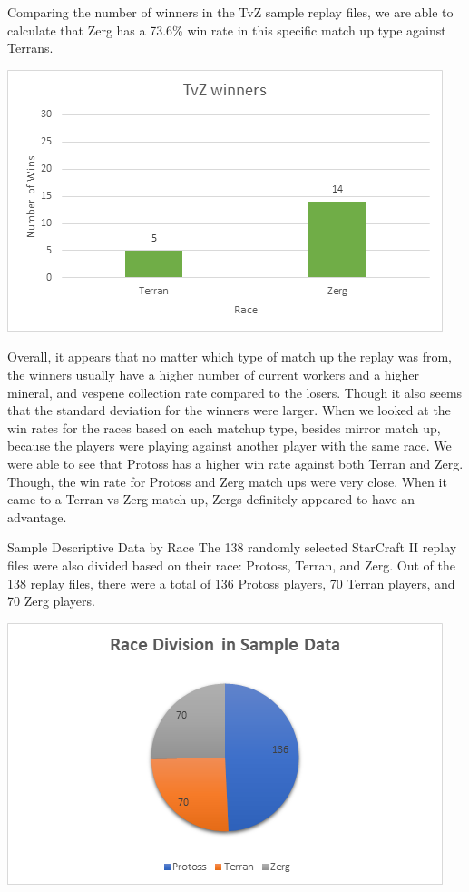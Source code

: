 \documentclass[a4paper,12pt]{report}
\begin{document}
Comparing the number of winners in the TvZ sample replay files, we are able to calculate that Zerg has a 73.6\% win rate in this specific match up type against Terrans.

\begin{center}
    \captionsetup{type=figure}
    \includegraphics[width=.9\linewidth]{media/TvZwinrate.png}
\end{center}

Overall, it appears that no matter which type of match up the replay was from, the winners usually have a higher number of current workers and a higher mineral, and vespene collection rate compared to the losers. Though it also seems that the standard deviation for the winners were larger. When we looked at the win rates for the races based on each matchup type, besides mirror match up, because the players were playing against another player with the same race. We were able to see that Protoss has a higher win rate against both Terran and Zerg. Though, the win rate for Protoss and Zerg match ups were very close. When it came to a Terran vs Zerg match up, Zergs definitely appeared to have an advantage. 

Sample Descriptive Data by Race
The 138 randomly selected StarCraft II replay files were also divided based on their race: Protoss, Terran, and Zerg. Out of the 138 replay files, there were a total of 136 Protoss players, 70 Terran players, and 70 Zerg players. 

\begin{center}
    \captionsetup{type=figure}
    \includegraphics[width=.9\linewidth]{media/RaceDivision.png}
\end{center}
\end{document}
